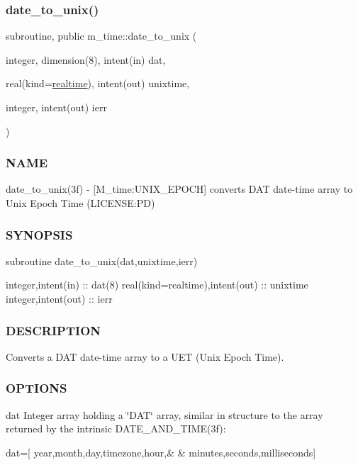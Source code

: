 \subsubsection{\texorpdfstring{date\+\_\+to\+\_\+unix()}{date\_to\_unix()}}
{\footnotesize\ttfamily subroutine, public m\+\_\+time\+::date\+\_\+to\+\_\+unix (\begin{DoxyParamCaption}\item[{integer, dimension(8), intent(in)}]{dat,  }\item[{real(kind=\mbox{\hyperlink{namespacem__time_ac10ea9e8d59ec74eaa7d89f2517d7422}{realtime}}), intent(out)}]{unixtime,  }\item[{integer, intent(out)}]{ierr }\end{DoxyParamCaption})}



\subsubsection*{N\+A\+ME}

date\+\_\+to\+\_\+unix(3f) -\/ \mbox{[}M\+\_\+time\+:U\+N\+I\+X\+\_\+\+E\+P\+O\+CH\mbox{]} converts D\+AT date-\/time array to Unix Epoch Time (L\+I\+C\+E\+N\+SE\+:PD) 

\subsubsection*{S\+Y\+N\+O\+P\+S\+IS}

\begin{DoxyVerb}subroutine date_to_unix(dat,unixtime,ierr)

 integer,intent(in)               :: dat(8)
 real(kind=realtime),intent(out)  :: unixtime
 integer,intent(out)              :: ierr
\end{DoxyVerb}


\subsubsection*{D\+E\+S\+C\+R\+I\+P\+T\+I\+ON}

Converts a D\+AT date-\/time array to a U\+ET (Unix Epoch Time).

\subsubsection*{O\+P\+T\+I\+O\+NS}

dat Integer array holding a \char`\"{}\+D\+A\+T\char`\"{} array, similar in structure to the array returned by the intrinsic D\+A\+T\+E\+\_\+\+A\+N\+D\+\_\+\+T\+I\+M\+E(3f)\+: \begin{DoxyVerb}dat=[ year,month,day,timezone,hour,&
 & minutes,seconds,milliseconds]
\end{DoxyVerb}
